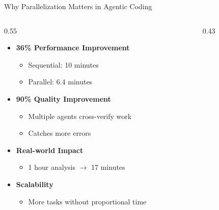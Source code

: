 \documentclass[aspectratio=169,11pt]{beamer}
\begin{document}
\begin{frame}{Why Parallelization Matters in Agentic Coding}
    \begin{columns}[T]
        \begin{column}{0.55\textwidth}
            \begin{itemize}
                \item \textbf{36\% Performance Improvement}
                    \begin{itemize}
                        \item Sequential: 10 minutes
                        \item Parallel: 6.4 minutes
                    \end{itemize}
                \item \textbf{90\% Quality Improvement}
                    \begin{itemize}
                        \item Multiple agents cross-verify work
                        \item Catches more errors
                    \end{itemize}
                \item \textbf{Real-world Impact}
                    \begin{itemize}
                        \item 1 hour analysis $\rightarrow$ 17 minutes
                    \end{itemize}
                \item \textbf{Scalability}
                    \begin{itemize}
                        \item More tasks without proportional time
                    \end{itemize}
            \end{itemize}
        \end{column}
        \begin{column}{0.43\textwidth}
\end{column}
\end{columns}
\end{frame}
\end{document}
